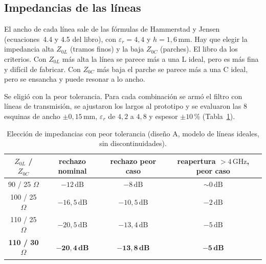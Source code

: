\begin{table}[htbp]
  \centering
  \caption{Valores escalados. Los stubs van numerados de la entrada a la salida.}
  \label{tab:frf_escalado}
\end{table}

\subsection{Impedancias de las líneas}

El ancho de cada línea sale de las fórmulas de Hammerstad y Jensen
(ecuaciones~4.4 y 4.5 del libro), con $\varepsilon_r = 4{,}4$ y
$h = 1{,}6\,\text{mm}$. Hay que elegir la impedancia alta $Z_{0L}$ (tramos
finos) y la baja $Z_{0C}$ (parches). El libro da los criterios. Con $Z_{0L}$
más alta la línea se parece más a una L ideal, pero es más fina y difícil de
fabricar. Con $Z_{0C}$ más baja el parche se parece más a una C ideal, pero se
ensancha y puede resonar a lo ancho.

Se eligió con la peor tolerancia. Para cada combinación se armó el filtro
con líneas de transmisión, se ajustaron los largos al prototipo y se evaluaron
las 8 esquinas de ancho $\pm 0{,}15\,\text{mm}$, $\varepsilon_r$ de $4{,}2$ a
$4{,}8$ y espesor $\pm 10$\,\% (Tabla~\ref{tab:frf_tolerancias}).

\begin{table}[htbp]
  \centering
  \caption{Elección de impedancias con peor tolerancia (diseño A, modelo de
  líneas ideales, sin discontinuidades).}
  \label{tab:frf_tolerancias}
  \begin{tabular}{cccc}
    \toprule
    $Z_{0L}$ / $Z_{0C}$ & rechazo nominal & rechazo peor caso & reapertura $> 4\,\text{GHz}$, peor caso \\
    \midrule
    90 / 25 $\Omega$  & $-12\,\text{dB}$ & $-8\,\text{dB}$ & $\sim 0\,\text{dB}$ \\
    100 / 25 $\Omega$ & $-16{,}5\,\text{dB}$ & $-10{,}5\,\text{dB}$ & $-2\,\text{dB}$ \\
    110 / 25 $\Omega$ & $-20{,}5\,\text{dB}$ & $-13{,}4\,\text{dB}$ & $-5\,\text{dB}$ \\
    \textbf{110 / 30 $\Omega$} & $\mathbf{-20{,}4\,dB}$ & $\mathbf{-13{,}8\,dB}$ & $\mathbf{-5\,dB}$ \\
    \bottomrule
  \end{tabular}
\end{table}


